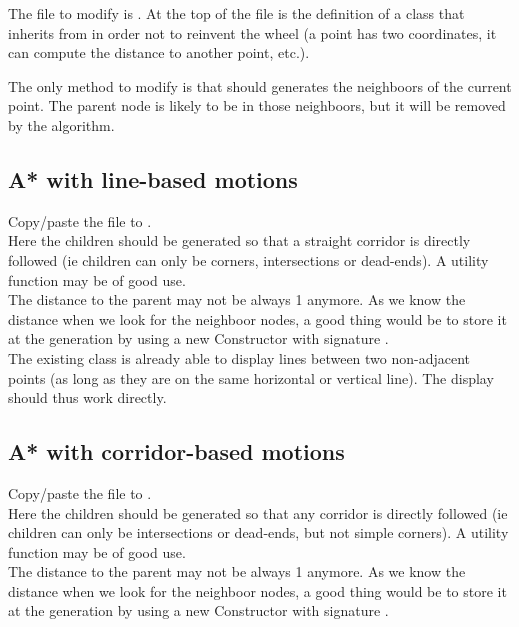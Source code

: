 \documentclass{ecnreport}
\begin{document}
The file to modify is .
At the top of the file is the definition of a  class
that inherits from  in order not to reinvent the wheel (a point has two coordinates, it can compute the distance to
another point, etc.).

The only method to modify is  that should generates the neighboors of the current point.
The parent node is likely to be in those neighboors, but it will be removed by the algorithm. 

\subsection{A* with line-based motions}

Copy/paste the  file to .\\

Here the children should be generated so that a straight corridor is directly followed (ie children can only be corners, intersections or dead-ends).
A utility function  may be of good use.\\

The distance to the parent may not be always 1 anymore. As we know the distance when we look for the neighboor nodes, a good thing would be to store it 
at the generation by using a new Constructor with signature .\\

The existing  class is already able to display lines between two non-adjacent points (as long as they are on the same horizontal or
vertical line). The display should thus work directly.

\subsection{A* with corridor-based motions}

Copy/paste the  file to .\\

Here the children should be generated so that any corridor is directly followed (ie children can only be intersections or dead-ends, but
not simple corners).
A utility function  may be of good use.\\

The distance to the parent may not be always 1 anymore. As we know the distance when we look for the neighboor nodes, a good thing would be to store it 
at the generation by using a new Constructor with signature . \\
\end{document}
